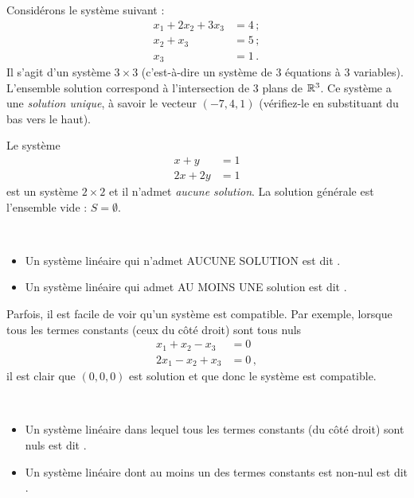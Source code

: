 \begin{myexample} Considérons le système suivant :
\begin{align*}
x_1+2x_2 + 3x_3 &= 4\,;\\ 
x_2+x_3 &= 5\,;\\
x_3&=1\,.
\end{align*}
Il s'agit d'un système $3\times 3$ (c'est-à-dire un système de $3$ équations à $3$ variables).
L'ensemble solution correspond à l'intersection de 3 plans de $\mathbb{R}^3$.  Ce système
a une \emph{solution unique}, \`a savoir  le vecteur $(-7,4,1)$ (vérifiez-le en
substituant du bas vers le haut).
\end{myexample}

\begin{myexample}Le système 
\begin{align*}
x +y &= 1\\
2x+2y &= 1
\end{align*}
est un système $2\times 2$ et il n'admet \emph{aucune solution}.  La solution générale est l'ensemble vide : $S = \emptyset$.
\end{myexample}

\begin{definition}\ 
\begin{itemize}
\item Un système linéaire qui n'admet AUCUNE SOLUTION est dit .
\item Un système linéaire qui admet AU MOINS UNE solution est dit \defn{compatible}.
\end{itemize}
\end{definition}

Parfois, il est facile de voir qu'un système est compatible.  Par exemple, lorsque tous les termes constants (ceux du côté droit) sont tous nuls
\begin{align*}
x_1 + x_2 - x_3 &= 0\\
2x_1 - x_2 + x_3 &= 0\,,
\end{align*}
il est clair que $(0,0,0)$ est solution et que donc le système est compatible.


\begin{definition}\ 
\begin{itemize}
\item Un système linéaire dans lequel tous les termes constants (du côté droit) sont nuls est dit .
\item Un système linéaire dont au moins un des termes constants est non-nul est dit .
\end{itemize}
\end{definition}

